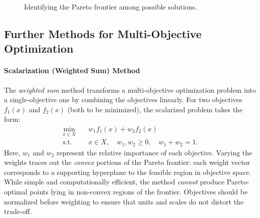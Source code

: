 \begin{figure}[h]
    \centering
    

    \caption{Identifying the Pareto frontier among possible solutions.}
\end{figure}

\subsection{Further Methods for Multi-Objective Optimization}

\paragraph{Scalarization (Weighted Sum) Method}
The \emph{weighted sum} method transforms a multi-objective optimization problem into a single-objective one by combining the objectives linearly. 
For two objectives $f_1(x)$ and $f_2(x)$ (both to be minimized), the scalarized problem takes the form:
\begin{align*}
\min_{x \in X} \quad & w_1 f_1(x) + w_2 f_2(x) \\
\text{s.t.} \quad & x \in X, \quad w_1, w_2 \ge 0, \quad w_1 + w_2 = 1.
\end{align*}
Here, $w_1$ and $w_2$ represent the relative importance of each objective. Varying the weights traces out the \emph{convex} portions of the Pareto frontier: each weight vector corresponds to a supporting hyperplane to the feasible region in objective space. 
While simple and computationally efficient, the method \emph{cannot} produce Pareto-optimal points lying in non-convex regions of the frontier. Objectives should be normalized before weighting to ensure that units and scales do not distort the trade-off.

